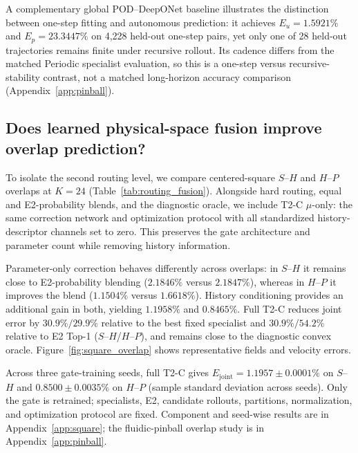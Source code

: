 \noindent A complementary global POD--DeepONet baseline illustrates the
distinction between one-step fitting and autonomous prediction: it achieves
$E_u=1.5921\%$ and $E_p=23.3447\%$ on 4,228 held-out one-step pairs, yet
only one of 28 held-out trajectories remains finite under recursive rollout.
Its cadence differs from the matched Periodic specialist evaluation, so this
is a one-step versus recursive-stability contrast, not a matched long-horizon
accuracy comparison (Appendix~\ref{app:pinball}).

\subsection{Does learned physical-space fusion improve overlap prediction?}

To isolate the second routing level, we compare centered-square $S$--$H$ and
$H$--$P$ overlaps at $K=24$ (Table~\ref{tab:routing_fusion}). Alongside hard
routing, equal and E2-probability blends, and the diagnostic oracle, we include
T2-C $\mu$-only: the same correction network and optimization protocol with all
standardized history-descriptor channels set to zero. This preserves the gate
architecture and parameter count while removing history information.

Parameter-only correction behaves differently across overlaps: in $S$--$H$ it
remains close to E2-probability blending ($2.1846\%$ versus $2.1847\%$), whereas
in $H$--$P$ it improves the blend ($1.1504\%$ versus $1.6618\%$).
History conditioning provides an additional gain in both, yielding
$1.1958\%$ and $0.8465\%$. Full T2-C reduces joint error by $30.9\%/29.9\%$
relative to the best fixed specialist and $30.9\%/54.2\%$ relative to E2 Top-1
($S$--$H$/$H$--$P$), and remains close to the diagnostic convex oracle.
Figure~\ref{fig:square_overlap} shows representative fields and velocity errors.

Across three gate-training seeds, full T2-C gives
$E_{\mathrm{joint}}=1.1957\pm0.0001\%$ on $S$--$H$ and
$0.8500\pm0.0035\%$ on $H$--$P$ (sample standard deviation across seeds).
Only the gate is retrained; specialists, E2, candidate rollouts, partitions,
normalization, and optimization protocol are fixed. Component and seed-wise
results are in Appendix~\ref{app:square}; the fluidic-pinball overlap study is
in Appendix~\ref{app:pinball}.

